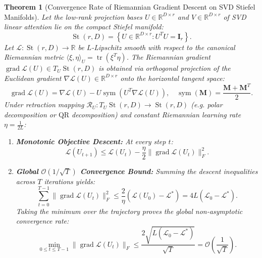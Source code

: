 \documentclass[journal]{IEEEtran}
\newtheorem{theorem}{Theorem}
\begin{document}
\begin{theorem}[Convergence Rate of Riemannian Gradient Descent on SVD Stiefel Manifolds]
Let the low-rank projection bases $U \in \mathbb{R}^{D \times r}$ and $V \in \mathbb{R}^{D \times r}$ of SVD linear attention lie on the compact Stiefel manifold:
\begin{equation}
\operatorname{St}(r, D) = \left\{ U \in \mathbb{R}^{D \times r} : U^T U = \mathbf{I}_r \right\}.
\end{equation}
Let $\mathcal{L}: \operatorname{St}(r, D) \to \mathbb{R}$ be $L$-Lipschitz smooth with respect to the canonical Riemannian metric $\langle \xi, \eta \rangle_U = \operatorname{tr}(\xi^T \eta)$.
The Riemannian gradient $\operatorname{grad} \mathcal{L}(U) \in T_U \operatorname{St}(r, D)$ is obtained via orthogonal projection of the Euclidean gradient $\nabla \mathcal{L}(U) \in \mathbb{R}^{D \times r}$ onto the horizontal tangent space:
\begin{equation}
\operatorname{grad} \mathcal{L}(U) = \nabla \mathcal{L}(U) - U \operatorname{sym}\left( U^T \nabla \mathcal{L}(U) \right), \quad \operatorname{sym}(\mathbf{M}) = \frac{\mathbf{M} + \mathbf{M}^T}{2}.
\end{equation}
Under retraction mapping $\mathcal{R}_U: T_U \operatorname{St}(r, D) \to \operatorname{St}(r, D)$ (e.g. polar decomposition or $\mathrm{QR}$ decomposition) and constant Riemannian learning rate $\eta = \frac{1}{2L}$:
\begin{enumerate}
    \item \textbf{Monotonic Objective Descent:} At every step $t$:
    \begin{equation}
    \mathcal{L}(U_{t+1}) \le \mathcal{L}(U_t) - \frac{\eta}{2} \|\operatorname{grad} \mathcal{L}(U_t)\|_F^2.
    \end{equation}
    \item \textbf{Global $\mathcal{O}(1/\sqrt{T})$ Convergence Bound:} Summing the descent inequalities across $T$ iterations yields:
    \begin{equation}
    \sum_{t=0}^{T-1} \|\operatorname{grad} \mathcal{L}(U_t)\|_F^2 \le \frac{2}{\eta} (\mathcal{L}(U_0) - \mathcal{L}^*) = 4 L (\mathcal{L}_0 - \mathcal{L}^*).
    \end{equation}
    Taking the minimum over the trajectory proves the global non-asymptotic convergence rate:
    \begin{equation}
    \min_{0 \le t \le T-1} \|\operatorname{grad} \mathcal{L}(U_t)\|_F \le \frac{2 \sqrt{L (\mathcal{L}_0 - \mathcal{L}^*)}}{\sqrt{T}} = \mathcal{O}\left( \frac{1}{\sqrt{T}} \right).
    \end{equation}
\end{enumerate}
\end{theorem}
\end{document}
